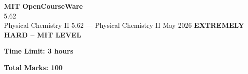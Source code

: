 \documentclass[12pt,a4paper]{exam}
\begin{document}
\begin{center}
{\LARGE \textbf{MIT OpenCourseWare}}\\5.62\\Physical Chemistry II
\vspace{0.5cm}
{5.62} --- {Physical Chemistry II}
\vspace{0.3cm}
May 2026
\vspace{0.3cm}
\textbf{EXTREMELY HARD -- MIT LEVEL}
\end{center}

\begin{center}
\textbf{Time Limit: 3 hours}
\end{center}

\begin{center}
\textbf{Total Marks: 100}
\end{center}

\vspace{0.5cm}
\end{document}
